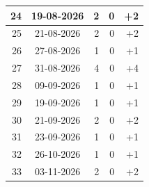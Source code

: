\begin{longtable}{|r|c|r|r|r|}
24 & 19-08-2026 & 2 & 0 & +2 \\ \hline
25 & 21-08-2026 & 2 & 0 & +2 \\ \hline
26 & 27-08-2026 & 1 & 0 & +1 \\ \hline
27 & 31-08-2026 & 4 & 0 & +4 \\ \hline
28 & 09-09-2026 & 1 & 0 & +1 \\ \hline
29 & 19-09-2026 & 1 & 0 & +1 \\ \hline
30 & 21-09-2026 & 2 & 0 & +2 \\ \hline
31 & 23-09-2026 & 1 & 0 & +1 \\ \hline
32 & 26-10-2026 & 1 & 0 & +1 \\ \hline
33 & 03-11-2026 & 2 & 0 & +2 \\ \hline
\end{longtable}

\normalsize

